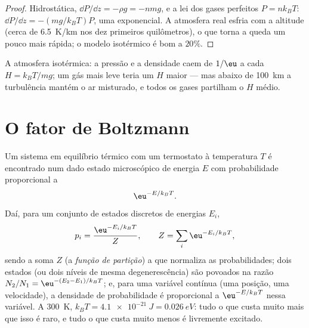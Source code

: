 \begin{proof}
Hidrostática, $\dd P/\dd z = -\rho g = -nmg$, e a lei dos gases perfeitos $P
= nk_BT$: $\dd P/\dd z = -(mg/k_BT)P$, uma exponencial. A atmosfera
real esfria com a altitude (cerca de \qty{6.5}{K/km} nos dez primeiros
quilômetros), o que torna a queda um pouco mais rápida; o modelo
isotérmico é bom a $20\%$.
\end{proof}

\begin{omfigure}

{\small A atmosfera isotérmica: a pressão e a densidade caem de $1/\eu$
a cada  $H = k_BT/mg$; um gás mais leve teria um $H$ maior
--- mas abaixo de \qty{100}{km} a turbulência mantém o ar misturado, e todos
os gases partilham o $H$ médio.}
\end{omfigure}

\section{O fator de Boltzmann}

\begin{theorem}\label{thm:b2:boltzmann-factor:factor}
Um sistema em equilíbrio térmico com um termostato à temperatura
$T$ é encontrado num dado estado microscópico de energia $E$ com
probabilidade proporcional a
\[
\eu^{-E/k_BT} .
\]
Daí, para um conjunto de estados discretos de energias $E_i$,
\[
p_i = \frac{\eu^{-E_i/k_BT}}{Z}, \qquad Z = \sum_i\eu^{-E_i/k_BT} ,
\]
sendo a soma $Z$ (a \emph{função de partição})
a que normaliza as probabilidades; dois estados (ou dois níveis de mesma
degenerescência) são povoados na razão $N_2/N_1 = \eu^{-(E_2 - E_1)/k_BT}$;
e, para uma variável contínua (uma posição, uma velocidade), a densidade
de probabilidade é proporcional a $\eu^{-E/k_BT}$ nessa variável. A
\qty{300}{K}, $k_BT = \qty{4.1e-21}{J} = \qty{0.026}{eV}$: tudo o que
custa muito mais que isso é raro, e tudo o que custa muito menos é
livremente excitado.
\end{theorem}

